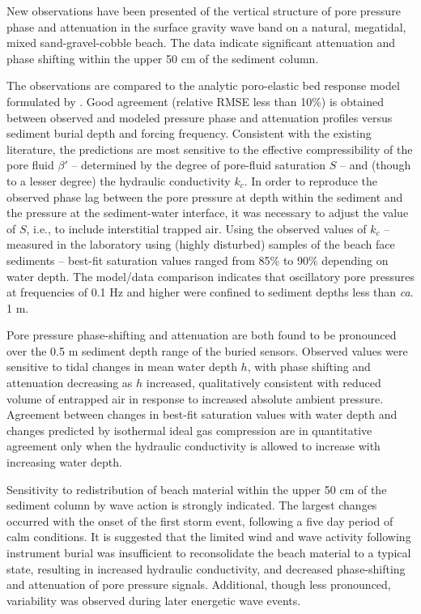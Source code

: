 New observations have been presented of the vertical structure of pore pressure phase and attenuation in the surface gravity wave band on a natural, megatidal, mixed sand-gravel-cobble beach. The data indicate significant attenuation and phase shifting within the upper 50 cm of the sediment column.

The observations are compared to the analytic poro-elastic bed response model formulated by \citet{Yamamoto_etal1978}. Good agreement (relative RMSE less than 10\%) is obtained between observed and modeled pressure phase and attenuation profiles versus sediment burial depth and forcing frequency. Consistent with the existing literature, the predictions are most sensitive to the effective compressibility of the pore fluid $\beta'$ -- determined by the degree of pore-fluid saturation $S$ -- and (though to a lesser degree) the hydraulic conductivity $k_{c}$. In order to reproduce the observed phase lag between the pore pressure at depth within the sediment and the pressure at the sediment-water interface, it was necessary to adjust the value of $S$, i.e., to include interstitial trapped air. Using the observed values of $k_c$ -- measured in the laboratory using (highly disturbed) samples of the beach face sediments -- best-fit saturation values ranged from 85\% to 90\% depending on water depth. The model/data comparison indicates that oscillatory pore pressures at frequencies of 0.1 Hz and higher were confined to sediment depths less than \textit{ca}. 1 m.

Pore pressure phase-shifting and attenuation are both found to be pronounced over the 0.5 m sediment depth range of the buried sensors. Observed values were sensitive to tidal changes in mean water depth $h$, with phase shifting and attenuation decreasing as $h$ increased, qualitatively consistent with reduced volume of entrapped air in response to increased absolute ambient pressure. Agreement between changes in best-fit saturation values with water depth and changes predicted by isothermal ideal gas compression are in quantitative agreement only when the hydraulic conductivity is allowed to increase with increasing water depth.

Sensitivity to redistribution of beach material within the upper 50 cm of the sediment column by wave action is strongly indicated. The largest changes occurred with the onset of the first storm event, following a five day period of calm conditions. It is suggested that the limited wind and wave activity following instrument burial was insufficient to reconsolidate the beach material to a typical state, resulting in increased hydraulic conductivity, and decreased phase-shifting and attenuation of pore pressure signals. Additional, though less pronounced, variability was observed during later energetic wave events.

